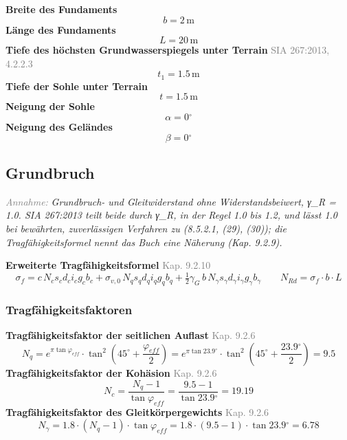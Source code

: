 \documentclass[11pt,a4paper]{article}
\newcommand{\normref}[1]{{\small\textcolor{gray}{#1}}}
\newcommand{\hinweis}[2]{\par\noindent\textcolor{gray}{\textit{#1:}} \textit{#2}\par}
\begin{document}
\noindent\textbf{Breite des Fundaments}
\begin{equation*}
b = 2\,\mathrm{m}
\end{equation*}
\noindent\textbf{Länge des Fundaments}
\begin{equation*}
L = 20\,\mathrm{m}
\end{equation*}
\noindent\textbf{Tiefe des höchsten Grundwasserspiegels unter Terrain} \hfill \normref{SIA 267:2013, 4.2.2.3}
\begin{equation*}
t_1 = 1.5\,\mathrm{m}
\end{equation*}
\noindent\textbf{Tiefe der Sohle unter Terrain}
\begin{equation*}
t = 1.5\,\mathrm{m}
\end{equation*}
\noindent\textbf{Neigung der Sohle}
\begin{equation*}
\alpha = 0{}^{\circ}
\end{equation*}
\noindent\textbf{Neigung des Geländes}
\begin{equation*}
\beta = 0{}^{\circ}
\end{equation*}
\subsection{Grundbruch}
\hinweis{Annahme}{Grundbruch- und Gleitwiderstand ohne Widerstandsbeiwert, γ\_R = 1.0. SIA 267:2013 teilt beide durch γ\_R, in der Regel 1.0 bis 1.2, und lässt 1.0 bei bewährten, zuverlässigen Verfahren zu (8.5.2.1, (29), (30)); die Tragfähigkeitsformel nennt das Buch eine Näherung (Kap. 9.2.9).}
\noindent\textbf{Erweiterte Tragfähigkeitsformel} \hfill \normref{Kap. 9.2.10}
\begin{equation*}
\sigma_f = c \, N_c s_c d_c i_c g_c b_c + \sigma_{v,0} \, N_q s_q d_q i_q g_q b_q + \tfrac{1}{2} \gamma_G \, b \, N_{\gamma} s_{\gamma} d_{\gamma} i_{\gamma} g_{\gamma} b_{\gamma} \qquad N_{Rd} = \sigma_f \cdot b \cdot L
\end{equation*}
\subsubsection{Tragfähigkeitsfaktoren}
\noindent\textbf{Tragfähigkeitsfaktor der seitlichen Auflast} \hfill \normref{Kap. 9.2.6}
\begin{equation*}
N_q = e^{\pi \tan \varphi_{eff}} \cdot \tan^{2}\left(45^\circ + \frac{\varphi_{eff}}{2}\right) = e^{\pi \tan 23.9{}^{\circ}} \cdot \tan^{2}\left(45^\circ + \frac{23.9{}^{\circ}}{2}\right) = 9.5
\end{equation*}
\noindent\textbf{Tragfähigkeitsfaktor der Kohäsion} \hfill \normref{Kap. 9.2.6}
\begin{equation*}
N_c = \frac{N_q - 1}{\tan \varphi_{eff}} = \frac{9.5 - 1}{\tan 23.9{}^{\circ}} = 19.19
\end{equation*}
\noindent\textbf{Tragfähigkeitsfaktor des Gleitkörpergewichts} \hfill \normref{Kap. 9.2.6}
\begin{equation*}
N_{\gamma} = 1.8 \cdot \left(N_q - 1\right) \cdot \tan \varphi_{eff} = 1.8 \cdot \left(9.5 - 1\right) \cdot \tan 23.9{}^{\circ} = 6.78
\end{equation*}
\end{document}
